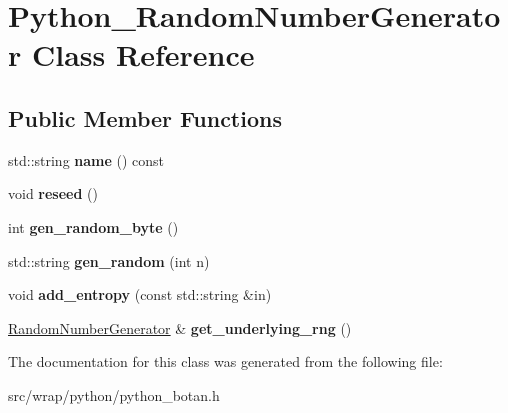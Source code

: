 \hypertarget{classPython__RandomNumberGenerator}{\section{Python\-\_\-\-Random\-Number\-Generator Class Reference}
\label{classPython__RandomNumberGenerator}
}
\subsection*{Public Member Functions}
\begin{DoxyCompactItemize}
\item 
\hypertarget{classPython__RandomNumberGenerator_ac4e0cbed33481e028594b96826f78012}{std\-::string {\bfseries name} () const }\label{classPython__RandomNumberGenerator_ac4e0cbed33481e028594b96826f78012}

\item 
\hypertarget{classPython__RandomNumberGenerator_a3f2f3299d04e28e6e2167e7a844b96d6}{void {\bfseries reseed} ()}\label{classPython__RandomNumberGenerator_a3f2f3299d04e28e6e2167e7a844b96d6}

\item 
\hypertarget{classPython__RandomNumberGenerator_adc5bad26b8ad3230c35d62a02d46b27d}{int {\bfseries gen\-\_\-random\-\_\-byte} ()}\label{classPython__RandomNumberGenerator_adc5bad26b8ad3230c35d62a02d46b27d}

\item 
\hypertarget{classPython__RandomNumberGenerator_a138ab3938c08a51dc8266de2d927f872}{std\-::string {\bfseries gen\-\_\-random} (int n)}\label{classPython__RandomNumberGenerator_a138ab3938c08a51dc8266de2d927f872}

\item 
\hypertarget{classPython__RandomNumberGenerator_a2d4d8185dc0c48c2a07200bd64df7f9a}{void {\bfseries add\-\_\-entropy} (const std\-::string \&in)}\label{classPython__RandomNumberGenerator_a2d4d8185dc0c48c2a07200bd64df7f9a}

\item 
\hypertarget{classPython__RandomNumberGenerator_a4948ac7970a372ad786d9c2c04e7523e}{\hyperlink{classBotan_1_1RandomNumberGenerator}{Random\-Number\-Generator} \& {\bfseries get\-\_\-underlying\-\_\-rng} ()}\label{classPython__RandomNumberGenerator_a4948ac7970a372ad786d9c2c04e7523e}

\end{DoxyCompactItemize}


The documentation for this class was generated from the following file\-:\begin{DoxyCompactItemize}
\item 
src/wrap/python/python\-\_\-botan.\-h\end{DoxyCompactItemize}
